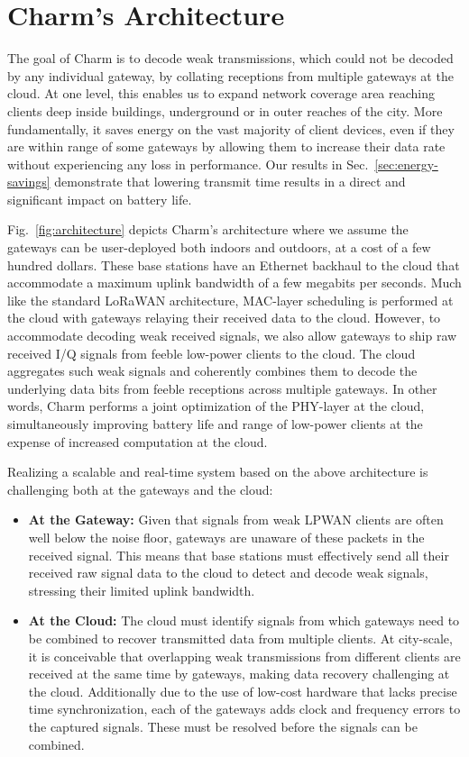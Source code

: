 \section{Charm's Architecture}
\label{sec:arch}

The goal of Charm is to decode weak transmissions, which could not be decoded
by any individual gateway, by collating receptions from multiple gateways at
the cloud. At one level, this  enables us to expand network coverage area
reaching clients deep inside buildings, underground or in outer reaches of the
city. More fundamentally, it saves energy on the vast majority of client
devices, even if they are within range of some gateways by allowing them to
increase their data rate without experiencing any loss in performance. Our
results in Sec.~\ref{sec:energy-savings} demonstrate that lowering transmit
time results in a direct and significant impact on battery life.

Fig.~\ref{fig:architecture} depicts Charm's architecture where we assume the
gateways can be user-deployed  both indoors and outdoors, at a cost of a few
hundred dollars. These base stations have an Ethernet backhaul to the cloud
that accommodate a maximum uplink bandwidth of a few megabits per seconds.
Much like the standard LoRaWAN architecture, MAC-layer scheduling is performed
at the cloud with gateways relaying their received data to the cloud. However,
to accommodate decoding weak received signals, we also allow gateways to ship
raw received I/Q signals from feeble low-power clients to the cloud. The cloud
aggregates such weak signals and coherently combines them to decode the
underlying data bits from feeble receptions across multiple gateways. In other
words, Charm performs a joint optimization of the  PHY-layer at the cloud,
simultaneously improving battery life and range of low-power clients at the
expense of increased computation at the cloud.

Realizing a scalable and real-time system based on the above architecture
is challenging both at the gateways and the cloud:
\begin{itemize}
\item {\bf At the Gateway: } Given that signals from weak LPWAN
clients are often well below the noise floor, gateways are unaware of these
packets in the received signal. This means that base stations must effectively
send all their received raw signal data to the cloud to detect and decode weak
signals, stressing their limited uplink bandwidth.
\item {\bf At the Cloud: } The cloud must identify signals from which
gateways need to be combined to recover transmitted data from multiple
clients. At city-scale, it is conceivable that overlapping weak transmissions
from different clients are received at the same time by gateways, making data
recovery challenging at the cloud. Additionally due to the use of low-cost
hardware that lacks precise time synchronization, each of the gateways adds
clock and frequency errors to the captured signals. These must be resolved
before the signals can be combined.
\end{itemize}

